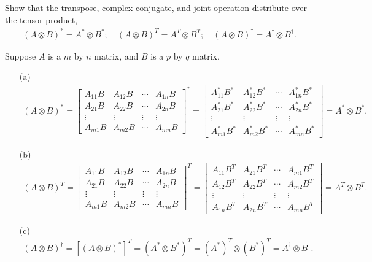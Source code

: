 \documentclass[en]{sol-man}
\begin{document}
\begin{exe}
    Show that the transpose, complex conjugate, and joint operation distribute over the tensor product,
    \begin{align}
        (A\otimes B)^*=A^*\otimes B^*;\quad(A\otimes B)^T=A^T\otimes B^T;\quad(A\otimes B)^{\dagger}=A^{\dagger}\otimes B^{\dagger}.
    \end{align}
\end{exe}
\begin{pf}
    Suppose $A$ is a $m$ by $n$ matrix, and $B$ is a $p$ by $q$ matrix.
    \begin{itemize}
        \item[(a)] 
        \begin{align}
            (A\otimes B)^*=\begin{bmatrix}
                A_{11}B&A_{12}B&\cdots&A_{1n}B\\
                A_{21}B&A_{22}B&\cdots&A_{2n}B\\
                \vdots&\vdots&\vdots&\vdots\\
                A_{m1}B&A_{m2}B&\cdots&A_{mn}B
            \end{bmatrix}^*=\begin{bmatrix}
                A_{11}^*B^*&A_{12}^*B^*&\cdots&A_{1n}^*B^*\\
                A_{21}^*B^*&A_{22}^*B^*&\cdots&A_{2n}^*B^*\\
                \vdots&\vdots&\vdots&\vdots\\
                A_{m1}^*B^*&A_{m2}^*B^*&\cdots&A_{mn}^*B^*
            \end{bmatrix}=A^*\otimes B^*.
        \end{align}
        \item[(b)] 
        \begin{align}
            (A\otimes B)^T=\begin{bmatrix}
                A_{11}B&A_{12}B&\cdots&A_{1n}B\\
                A_{21}B&A_{22}B&\cdots&A_{2n}B\\
                \vdots&\vdots&\vdots&\vdots\\
                A_{m1}B&A_{m2}B&\cdots&A_{mn}B
            \end{bmatrix}^T=\begin{bmatrix}
                A_{11}B^T&A_{21}B^T&\cdots&A_{m1}B^T\\
                A_{12}B^T&A_{22}B^T&\cdots&A_{m2}B^T\\
                \vdots&\vdots&\vdots&\vdots\\
                A_{1n}B^T&A_{2n}B^T&\cdots&A_{mn}B^T
            \end{bmatrix}=A^T\otimes B^T.
        \end{align}
        \item[(c)] 
        \begin{align}
            (A\otimes B)^{\dagger}=[(A\otimes B)^*]^T=(A^*\otimes B^*)^T=(A^*)^T\otimes(B^*)^T=A^{\dagger}\otimes B^{\dagger}.
        \end{align}
    \end{itemize}
\end{pf}
\end{document}
